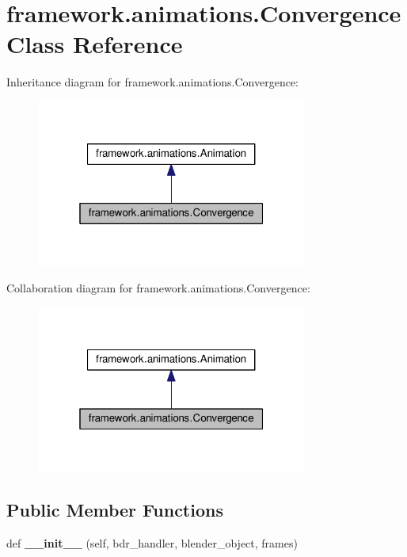 \hypertarget{classframework_1_1animations_1_1Convergence}{}\section{framework.\+animations.\+Convergence Class Reference}
\label{classframework_1_1animations_1_1Convergence}


Inheritance diagram for framework.\+animations.\+Convergence\+:
\nopagebreak
\begin{figure}[H]
\begin{center}
\leavevmode
\includegraphics[width=253pt]{classframework_1_1animations_1_1Convergence__inherit__graph}
\end{center}
\end{figure}


Collaboration diagram for framework.\+animations.\+Convergence\+:
\nopagebreak
\begin{figure}[H]
\begin{center}
\leavevmode
\includegraphics[width=253pt]{classframework_1_1animations_1_1Convergence__coll__graph}
\end{center}
\end{figure}
\subsection*{Public Member Functions}
\begin{DoxyCompactItemize}
\item 
def {\bfseries \+\_\+\+\_\+init\+\_\+\+\_\+} (self, bdr\+\_\+handler, blender\+\_\+object, frames)\hypertarget{classframework_1_1animations_1_1Convergence_abe3ee04c7e1218fdad4dc14961c5504f}{}\label{classframework_1_1animations_1_1Convergence_abe3ee04c7e1218fdad4dc14961c5504f}

\end{DoxyCompactItemize}

